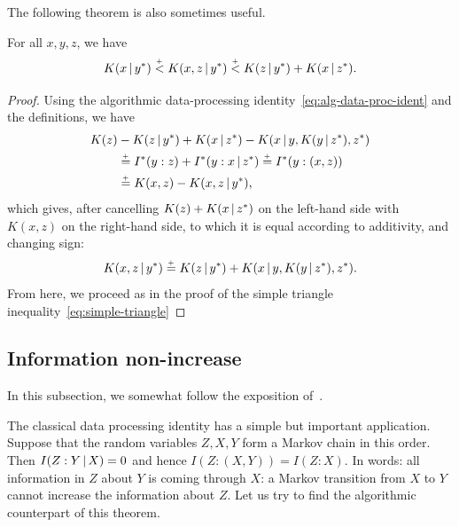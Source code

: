 The following theorem is also sometimes useful.

 \begin{theorem}\label{lem:triangle}
  \leanok
For all \( x,y,z \), we have
 \begin{equation}\label{eq:starry-triangle}
  K(x \,\vert\, y^*) \stackrel{{}_+}{<} K(x, z \,\vert\, y^{*})
                \stackrel{{}_+}{<} K(z \,\vert\, y^*) + K(x \,\vert\, z^*).
 \end{equation}
 \end{theorem}

 \begin{proof}
  \leanok
Using the algorithmic data-processing
identity~\eqref{eq:alg-data-proc-ident} and the definitions, we have
 \begin{align*}
 K(z) & - K(z \,\vert\, y^{*}) + 
 K(x \,\vert\, z^{*}) - K(x \,\vert\, y, K(y \,\vert\, z^{*}), z^{*})  
\\ &\stackrel{{}_+}{=} I^{*}(y : z) + I^{*}(y : x \,\vert\, z^{*}) \stackrel{{}_+}{=} I^{*}(y : (x, z)) 
\\ &\stackrel{{}_+}{=} K(x, z) - K(x, z \,\vert\, y^{*}),
 \end{align*}
which gives, after cancelling \( K(z) + K(x \,\vert\, z^{*}) \) on the
left-hand side with \( K(x, z) \) on the right-hand side, to which it is equal
according to additivity, and changing sign:
 \[
  K(x, z \,\vert\, y^{*}) \stackrel{{}_+}{=}
  K(z \,\vert\, y^{*}) + K(x \,\vert\, y, K(y \,\vert\, z^{*}), z^{*}).
 \]
From here, we proceed as in the proof of the simple triangle
inequality~\eqref{eq:simple-triangle}
\end{proof}


\subsection{Information non-increase}

In this subsection, we somewhat follow the exposition  
of~\cite{GacsTrompVitAlgorStat00}.

The classical data processing identity has a simple but important
application.
Suppose that the random variables \( Z, X, Y \) form a Markov chain in this
order.
Then \( I(Z : Y \,\vert\, X) = 0 \) and hence \( I(Z : (X, Y)) = I(Z : X) \).
In words: all information in \( Z \) about \( Y \) is coming through \( X \): a Markov
transition from \( X \) to \( Y \) cannot increase the information about \( Z \).
Let us try to find the algorithmic counterpart of this theorem.

